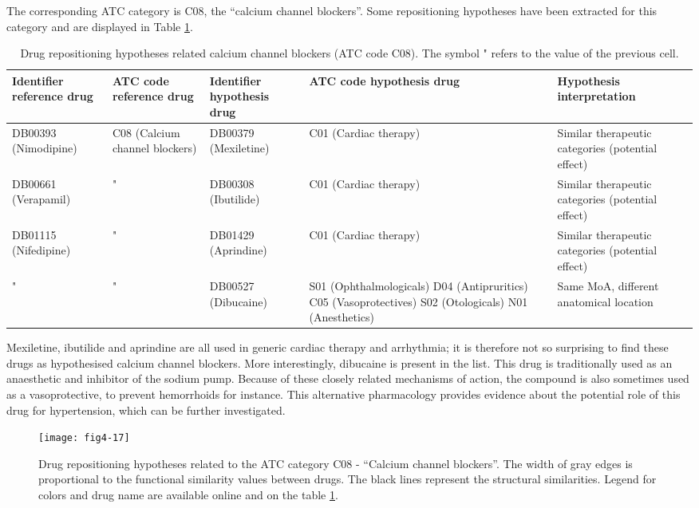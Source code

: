 The corresponding ATC category is C08, the “calcium channel blockers”. Some repositioning hypotheses have been extracted for this category and are displayed in Table \ref{tab:tablec08}. 

\begin{table}[htbp]
\scriptsize
\begin{tabular}{|p{2cm}|p{2cm}|p{2cm}|p{3cm}|p{4cm}|}
\hline
\textbf{Identifier reference drug} & \textbf{ATC code reference drug} & \textbf{Identifier hypothesis drug} & \textbf{ATC code hypothesis drug} & \textbf{Hypothesis interpretation} \\ \hline
DB00393 (Nimodipine) & C08 (Calcium channel blockers) & DB00379 (Mexiletine) & C01 (Cardiac therapy) & Similar therapeutic categories (potential effect) \\ \hline
DB00661 (Verapamil) & " & DB00308 (Ibutilide) & C01 (Cardiac therapy) & Similar therapeutic categories (potential effect) \\ \hline
DB01115 (Nifedipine) & " & DB01429 (Aprindine) & C01 (Cardiac therapy) & Similar therapeutic categories (potential effect) \\ \hline
" & " & DB00527 (Dibucaine) & S01 (Ophthalmologicals)
D04 (Antipruritics)
C05 (Vasoprotectives)
S02 (Otologicals)
N01 (Anesthetics) & Same MoA, different anatomical location \\ \hline
\end{tabular}
\caption{Drug repositioning hypotheses related calcium channel blockers (ATC code C08). The symbol " refers to the value of the previous cell.}
\label{tab:tablec08}
\end{table}

Mexiletine, ibutilide and aprindine are all used in generic cardiac therapy and arrhythmia; it is therefore not so surprising to find these drugs as hypothesised calcium channel blockers. More interestingly, dibucaine is present in the list. This drug is traditionally used as an anaesthetic and inhibitor of the sodium pump. Because of these closely related mechanisms of action, the compound is also sometimes used as a vasoprotective, to prevent hemorrhoids for instance. This alternative pharmacology provides evidence about the potential role of this drug for hypertension, which can be further investigated.

\begin{figure}[H]
    \centering
    \texttt{[image: fig4-17]}
    \caption{Drug repositioning hypotheses related to the ATC category C08 - “Calcium channel blockers”. The width of gray edges is proportional to the functional similarity values between drugs. The black lines represent the structural similarities. Legend for colors and drug name are available online and on the table \ref{tab:tablec08}.}
    \label{fig4-17}
\end{figure}

